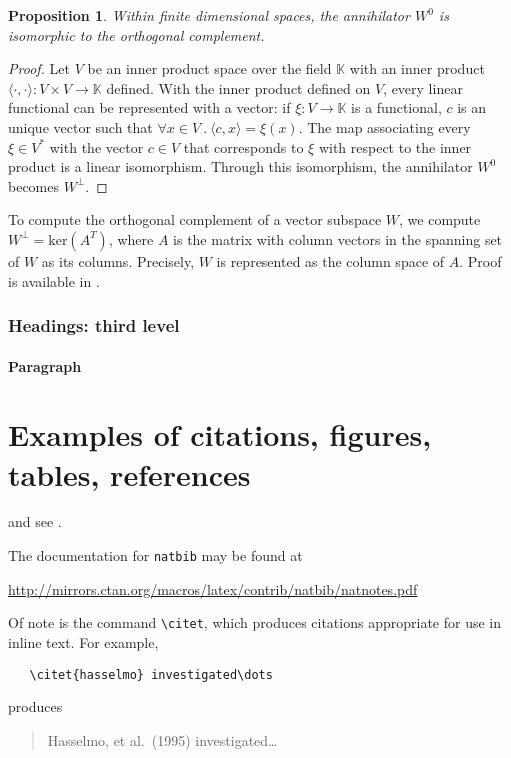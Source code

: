 \documentclass{article}
\theoremstyle{plain}%
\newtheorem{prop}[thm]{Proposition}
\theoremstyle{definition}
\theoremstyle{remark}
\def\K{\mathbb{K}}
\newcommand{\mker}[1]{\text{ker}\left(#1\right)}
\begin{document}
\begin{prop}
  Within finite dimensional spaces, the annihilator $W^0$ is isomorphic
  to the orthogonal complement.  
\end{prop}

\begin{proof}
  Let $V$ be an inner product space over the field $\K$ with an inner product
  $\langle \cdot , \cdot \rangle : V \times V \to \K$ defined. 
  With the inner product defined on $V$, every linear functional can be 
  represented with a vector: if $\xi : V \to \K$ is a functional, $c$ 
  is an unique vector such that $\forall x \in V \: . \: \langle c, x \rangle = \xi(x)$.
  The map associating every $\xi \in V^*$ with the vector $c \in V$ that corresponds 
  to $\xi$ with respect to the inner product is a linear isomorphism. Through this 
  isomorphism, the annihilator $W^0$ becomes $W^\perp$.
\end{proof}


To compute the orthogonal complement of a vector subspace $W$, we
compute $W^\perp = \mker{A^T}$, where $A$ is the matrix with 
column vectors in the spanning set of $W$ as its columns. Precisely, $W$ is 
represented as the 
column space of $A$. Proof is available in \cite{ila}.


\subsubsection{Headings: third level}

\paragraph{Paragraph}




\section{Examples of citations, figures, tables, references}
\label{sec:others}

\cite{kour2014real,kour2014fast} and see \cite{hadash2018estimate}.

The documentation for \verb+natbib+ may be found at
\begin{center}
  \url{http://mirrors.ctan.org/macros/latex/contrib/natbib/natnotes.pdf}
\end{center}
Of note is the command \verb+\citet+, which produces citations
appropriate for use in inline text.  For example,
\begin{verbatim}
   \citet{hasselmo} investigated\dots
\end{verbatim}
produces
\begin{quote}
  Hasselmo, et al.\ (1995) investigated\dots
\end{quote}
\end{document}
